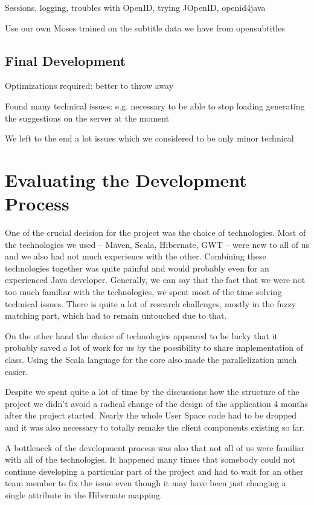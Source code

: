 Sessions, logging, troubles with OpenID, trying JOpenID, openid4java 

Use our own Moses trained on the subtitle data we have from opensubtitles

\subsection{Final Development}

Optimizations required: better to throw away 

Found many technical issues: e.g. necessary to be able to stop loading generating the suggestions on the server at the moment

We left to the end a lot issues which we considered to be only minor technical 

\section{Evaluating the Development Process}

One of the crucial decision for the project was the choice of technologies. Most of the technologies we used -- Maven, Scala, Hibernate, GWT -- were new to all of us and we also had not much experience with the other. Combining these technologies together was quite painful and would probably even for an experienced Java developer. Generally, we can say that the fact that we were not too much familiar with the technologies, we spent most of the time solving technical issues. There is quite a lot of research challenges, mostly in the fuzzy matching part, which had to remain untouched due to that.

On the other hand the choice of technologies appeared to be lucky that it probably saved a lot of work for us by the possibility to share implementation of class. Using the Scala language for the core also made the parallelization much easier.

Despite we spent quite a lot of time by the discussions how the structure of the project we didn't avoid a radical change of the design of the application 4 months after the project started. Nearly the whole User Space code had to be dropped and it was also necessary to totally remake the client components existing so far.

A bottleneck of the development process was also that not all of us were familiar with all of the technologies. It happened many times that somebody could not continue developing a particular part of the project and had to wait for an other team member to fix the issue even though it may have been just changing a single attribute in the Hibernate mapping.





